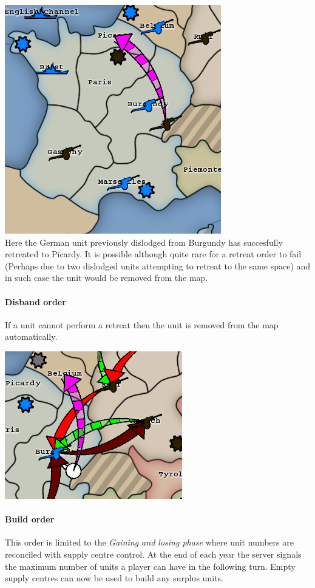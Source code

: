 \documentclass[pdftex,12pt,a4paper]{report}
\begin{document}
\includegraphics{./screenshots/DefRetreat2.png} \\[1cm]
Here the German unit previously dislodged from Burgundy has
succesfully retreated to Picardy.  It is possible although quite rare
for a retreat order to fail (Perhaps due to two dislodged units
attempting to retreat to the same space) and in such case the unit
would be removed from the map.

\paragraph{Disband order}
If a unit cannot perform a retreat then the unit is removed from the
map automatically.

\includegraphics{./screenshots/ImmRetreat0.png} \\[1cm]

\paragraph{Build order}
This order is limited to the \textit{Gaining and losing phase} where
unit numbers are reconciled with supply centre control. At the end of
each year the server signals the maximum number of units a player can
have in the following turn. Empty supply centres can now be used to
build any surplus units.
\end{document}
